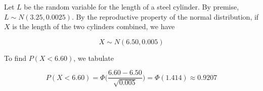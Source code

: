 \documentclass[10pt, oneside]{article}
\begin{document}
\begin{enumerate}[label=10.\arabic*]
Let $L$ be the random variable for the length of a steel cylinder. By premise, $L \sim N(3.25, 0.0025)$. By the reproductive property of the normal distribution, if $X$ is the length of the two cylinders combined, we have

\[ X \sim N(6.50, 0.005) \]

To find $P(X < 6.60)$, we tabulate

\[ P(X < 6.60) = \Phi \bigg( \frac{6.60 - 6.50}{\sqrt{0.005}} \bigg) = \Phi(1.414) \approx \boxed{0.9207} \]

\end{enumerate}

\newpage
\end{document}
